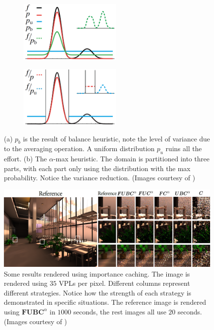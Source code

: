 \documentclass[]{book}
\begin{document}
\begin{figure}[t]
	\begin{subfigure}{0.5\textwidth}
		\centering
		\includegraphics[height=1.2in]{img/IMP_5b_1.png}
		\caption{}
		\label{fig:IMP:combination:a}
	\end{subfigure}%
	\begin{subfigure}{0.5\textwidth}
		\centering
		\includegraphics[height=1.2in]{img/IMP_5b_2.png}
		\caption{}
		\label{fig:IMP:combination:b}
	\end{subfigure}
	\caption[Bilaterial Combination of Distributions]{(a) $p_b$ is the result of balance heuristic, note the level of variance due to the averaging operation. A uniform distribution $p_u$ ruins all the effort. (b) The $\alpha$-max heuristic. The domain is partitioned into three parts, with each part only using the distribution with the max probability. Notice the variance reduction. (Images courtesy of \citeauthor{georgiev2012importance})}
	\label{fig:IMP:combination}
\end{figure}

\begin{figure}
	\centering
	\includegraphics[width=\textwidth]{img/IMP_5c.png}
	\caption[Importance Caching Results]{Some results rendered using importance caching. The image is rendered using $35$ VPLs per pixel. Different columns represent different strategies. Notice how the strength of each strategy is demonstrated in specific situations. The reference image is rendered using $\boldsymbol{FUBC}^\alpha$ in $1000$ seconds, the rest images all use $20$ seconds. (Images courtesy of \citeauthor{georgiev2012importance})}
	\label{fig:IMP:results}
\end{figure}
\end{document}
